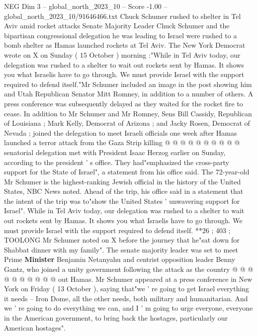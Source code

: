 \begin{textsample}{NEG Dim 3 – global\_north\_2023\_10 – Score -1.00 – global\_north\_2023\_10/91646466.txt}  \label{ex:f3_neg_255}
Chuck Schumer rushed to shelter in Tel Aviv amid rocket attacks Senate Majority Leader Chuck Schumer and the bipartisan congressional delegation he was leading to Israel were rushed to a bomb shelter as Hamas launched rockets at Tel Aviv.
The New York Democrat wrote on X on Sunday ( 15 October ) morning :"While in Tel Aviv today, our delegation was rushed to a shelter to wait out rockets sent by Hamas.
It shows you what Israelis have to go through.
We must provide Israel with the support required to defend itself."Mr Schumer included an image in the post showing him and Utah Republican Senator Mitt Romney, in addition to a number of others.
A press conference was subsequently delayed as they waited for the rocket fire to cease.
In addition to Mr Schumer and Mr Romney, Sens Bill Cassidy, Republican of Louisiana ; Mark Kelly, Democrat of Arizona ; and Jacky Rosen, Democrat of Nevada ; joined the delegation to meet Israeli officials one week after Hamas launched a terror attack from the Gaza Strip killing @ @ @ @ @ @ @ @ @ @ senatorial delegation met with President Isaac Herzog earlier on Sunday, according to the president ' s office.
They had"emphasized the cross-party support for the State of Israel", a statement from his office said.
The 72-year-old Mr Schumer is the highest-ranking Jewish official in the history of the United States, NBC News noted.
Ahead of the trip, his office said in a statement that the intent of the trip was to"show the United States ' unwavering support for Israel".
While in Tel Aviv today, our delegation was rushed to a shelter to wait out rockets sent by Hamas.
It shows you what Israelis have to go through.
We must provide Israel with the support required to defend itself. **26 ; 403 ; TOOLONG Mr Schumer noted on X before the journey that he"sat down for Shabbat dinner with my family".
The senate majority leader was set to meet Prime \textbf{Minister} Benjamin Netanyahu and centrist opposition leader Benny Gantz, who joined a unity government following the attack as the country @ @ @ @ @ @ @ @ @ @ out Hamas.
Mr Schumer appeared at a press conference in New York on Friday ( 13 October ), saying that"we ' re going to get Israel everything it needs -- Iron Dome, all the other needs, both military and humanitarian.
And we ' re going to do everything we can, and I ' m going to urge everyone, everyone in the American government, to bring back the hostages, particularly our American hostages".

\end{textsample}
